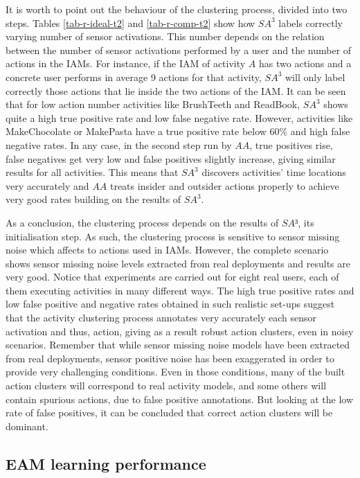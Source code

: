 It is worth to point out the behaviour of the clustering process, divided into two steps. Tables \ref{tab-r-ideal-t2} and \ref{tab-r-comp-t2} show how $SA^3$ labels correctly varying number of sensor activations. This number depends on the relation between the number of sensor activations performed by a user and the number of actions in the IAMs. For instance, if the IAM of activity $A$ has two actions and a concrete user performs in average 9 actions for that activity, $SA^3$ will only label correctly those actions that lie inside the two actions of the IAM. It can be seen that for low action number activities like BrushTeeth and ReadBook, $SA^3$ shows quite a high true positive rate and low false negative rate. However, activities like MakeChocolate or MakePasta have a true positive rate below 60\% and high false negative rates. In any case, in the second step run by $AA$, true positives rise, false negatives get very low and false positives slightly increase, giving similar results for all activities. This means that $SA^3$ discovers activities' time locations very accurately and $AA$ treats insider and outsider actions properly to achieve very good rates building on the results of $SA^3$.

As a conclusion, the clustering process depends on the results of $SA³$, its initialisation step. As such, the clustering process is sensitive to sensor missing noise which affects to actions used in IAMs. However, the complete scenario shows sensor missing noise levels extracted from real deployments and results are very good. Notice that experiments are carried out for eight real users, each of them executing activities in many different ways. The high true positive rates and low false positive and negative rates obtained in such realistic set-ups suggest that the activity clustering process annotates very accurately each sensor activation and thus, action, giving as a result robust action clusters, even in noisy scenarios. Remember that while sensor missing noise models have been extracted from real deployments, sensor positive noise has been exaggerated in order to provide very challenging conditions. Even in those conditions, many of the built action clusters will correspond to real activity models, and some others will contain spurious actions, due to false positive annotations. But looking at the low rate of false positives, it can be concluded that correct action clusters will be dominant. 

\subsection{EAM learning performance}
\label{subsec:evaluation:eam}

